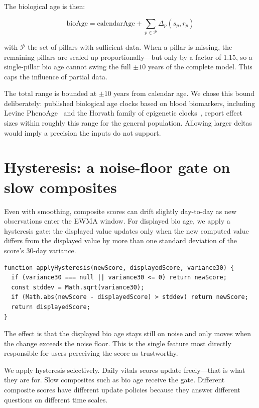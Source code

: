 \documentclass[10pt, a4paper]{article}
\begin{document}
The biological age is then:

\begin{equation}
\mathrm{bioAge} = \mathrm{calendarAge} + \sum_{p \in \mathcal{P}} \Delta_p(s_p, r_p)
\label{eq:bioage}
\end{equation}

with $\mathcal{P}$ the set of pillars with sufficient data. When a pillar is missing, the remaining pillars are scaled up proportionally---but only by a factor of 1.15, so a single-pillar bio age cannot swing the full $\pm 10$ years of the complete model. This caps the influence of partial data.

The total range is bounded at $\pm 10$ years from calendar age. We chose this bound deliberately: published biological age clocks based on blood biomarkers, including Levine PhenoAge~\cite{levine_phenoage_2018} and the Horvath family of epigenetic clocks~\cite{horvath_clock_2013}, report effect sizes within roughly this range for the general population. Allowing larger deltas would imply a precision the inputs do not support.

\section{Hysteresis: a noise-floor gate on slow composites}

Even with smoothing, composite scores can drift slightly day-to-day as new observations enter the EWMA window. For displayed bio age, we apply a hysteresis gate: the displayed value updates only when the new computed value differs from the displayed value by more than one standard deviation of the score's 30-day variance.

\begin{lstlisting}
function applyHysteresis(newScore, displayedScore, variance30) {
  if (variance30 === null || variance30 <= 0) return newScore;
  const stddev = Math.sqrt(variance30);
  if (Math.abs(newScore - displayedScore) > stddev) return newScore;
  return displayedScore;
}
\end{lstlisting}

The effect is that the displayed bio age stays still on noise and only moves when the change exceeds the noise floor. This is the single feature most directly responsible for users perceiving the score as trustworthy.

We apply hysteresis selectively. Daily vitals scores update freely---that is what they are for. Slow composites such as bio age receive the gate. Different composite scores have different update policies because they answer different questions on different time scales.
\end{document}
